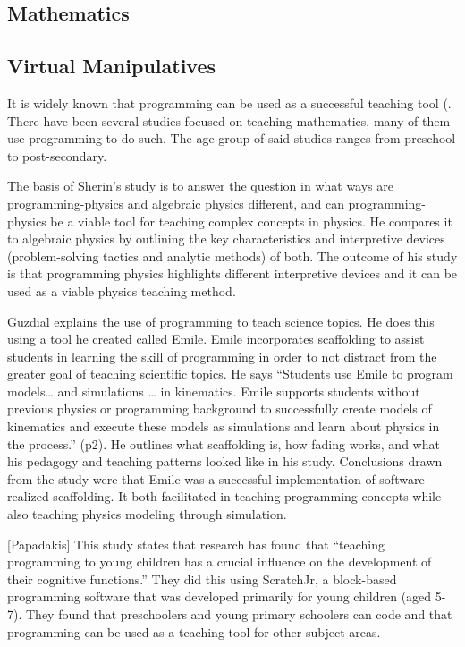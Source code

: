 \documentclass[12pt]{extarticle}
\begin{document}
\subsection{Mathematics} \cite{}
\subsection{Virtual Manipulatives}\cite{lye}



It is widely known that programming can be used as a successful teaching tool (. There have been several studies focused on teaching mathematics, many of them use programming to do such. The age group of said studies ranges from preschool to post-secondary. 

The basis of Sherin’s study is to answer the question in what ways are programming-physics and algebraic physics different, and can programming-physics be a viable tool for teaching complex concepts in physics. He compares it to algebraic physics by outlining the key characteristics and interpretive devices (problem-solving tactics and analytic methods) of both. The outcome of his study is that programming physics highlights different interpretive devices and it can be used as a viable physics teaching method.

Guzdial explains the use of programming to teach science topics. He does this using a tool he created called Emile. Emile incorporates scaffolding to assist students in learning the skill of programming in order to not distract from the greater goal of teaching scientific topics. He says “Students use Emile to program models… and simulations … in kinematics. Emile supports students without previous physics or programming background to successfully create models of kinematics and execute these models as simulations and learn about physics in the process.” (p2). He outlines what scaffolding is, how fading works, and what his pedagogy and teaching patterns looked like in his study. Conclusions drawn from the study were that Emile was a successful implementation of software realized scaffolding. It both facilitated in teaching programming concepts while also teaching physics modeling through simulation.

[Papadakis] This study states that research has found that “teaching programming to young children has a crucial influence on the development of their cognitive functions.” They did this using ScratchJr, a block-based programming software that was developed primarily for young children (aged 5-7). They found that preschoolers and young primary schoolers can code and that programming can be used as a teaching tool for other subject areas.
\end{document}
